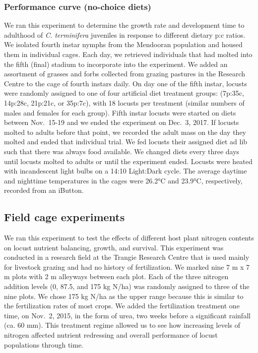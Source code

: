 \documentclass[
]{article}
\begin{document}
\subsubsection{Performance curve (no-choice
diets)}\label{performance-curve-no-choice-diets}

We ran this experiment to determine the growth rate and development time
to adulthood of \emph{C. terminifera} juveniles in response to different
dietary p:c ratios. We isolated fourth instar nymphs from the Mendooran
population and housed them in individual cages. Each day, we retrieved
individuals that had molted into the fifth (final) stadium to
incorporate into the experiment. We added an assortment of grasses and
forbs collected from grazing pastures in the Research Centre to the cage
of fourth instars daily. On day one of the fifth instar, locusts were
randomly assigned to one of four artificial diet treatment groups:
(7p:35c, 14p:28c, 21p:21c, or 35p:7c), with 18 locusts per treatment
(similar numbers of males and females for each group). Fifth instar
locusts were started on diets between Nov.~15-19 and we ended the
experiment on Dec.~3, 2017. If locusts molted to adults before that
point, we recorded the adult mass on the day they molted and ended that
individual trial. We fed locusts their assigned diet ad lib such that
there was always food available. We changed diets every three days until
locusts molted to adults or until the experiment ended. Locusts were
heated with incandescent light bulbs on a 14:10 Light:Dark cycle. The
average daytime and nighttime temperatures in the cages were 26.2°C and
23.9°C, respectively, recorded from an iButton.

\subsection{Field cage experiments}\label{field-cage-experiments}

We ran this experiment to test the effects of different host plant
nitrogen contents on locust nutrient balancing, growth, and survival.
This experiment was conducted in a research field at the Trangie
Research Centre that is used mainly for livestock grazing and had no
history of fertilization. We marked nine 7 m x 7 m plots with 2 m
alleyways between each plot. Each of the three nitrogen addition levels
(0, 87.5, and 175 kg N/ha) was randomly assigned to three of the nine
plots. We chose 175 kg N/ha as the upper range because this is similar
to the fertilization rates of most crops. We added the fertilization
treatment one time, on Nov.~2, 2015, in the form of urea, two weeks
before a significant rainfall (ca. 60 mm). This treatment regime allowed
us to see how increasing levels of nitrogen affected nutrient redressing
and overall performance of locust populations through time.
\end{document}

